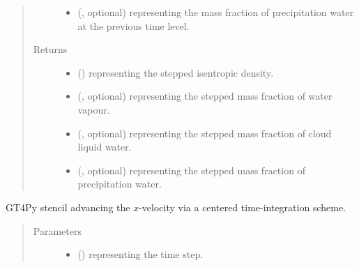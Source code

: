 \documentclass[letterpaper,10pt,english]{sphinxmanual}
\begin{document}
\begin{fulllineitems}
\begin{fulllineitems}
\begin{quote}
\begin{description}
\begin{itemize}
\item {} 
 (, optional) \textendash{}  representing the mass fraction of precipitation water at the previous time level.

\end{itemize}

\item[{Returns}] \leavevmode
\begin{itemize}
\item {} 
 () \textendash{}  representing the stepped isentropic density.

\item {} 
 (, optional) \textendash{}  representing the stepped mass fraction of water vapour.

\item {} 
 (, optional) \textendash{}  representing the stepped mass fraction of cloud liquid water.

\item {} 
 (, optional) \textendash{}  representing the stepped mass fraction of precipitation water.

\end{itemize}


\end{description}\end{quote}

\end{fulllineitems}


\begin{fulllineitems}
\label{\detokenize{api:tasmania.dycore.prognostic_isentropic_nonconservative_centered.PrognosticIsentropicNonconservativeCentered._stencil_stepping_by_neglecting_vertical_advection_velocity_x_defs}}
GT4Py stencil advancing the \(x\)-velocity via a centered time-integration scheme.
\begin{quote}\begin{description}
\item[{Parameters}] \leavevmode\begin{itemize}
\item {} 
 () \textendash{}  representing the time step.


\end{itemize}
\end{description}
\end{quote}
\end{fulllineitems}
\end{fulllineitems}
\end{document}
